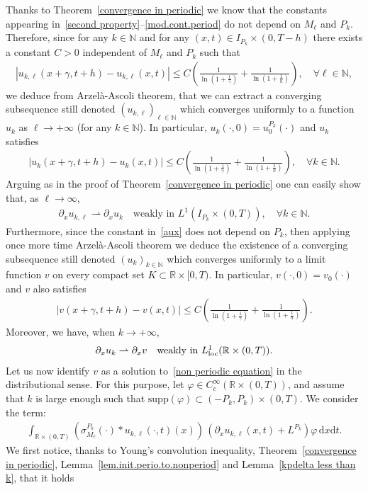 \documentclass[11pt]{amsart}
\newcommand{\dd}{\mathrm{d}}
\newcommand{\pa}{\partial}
\newcommand{\R}{\mathbb{R}}
\newcommand{\N}{\mathbb{N}}
\begin{document}
\begin{appendix}
Thanks to Theorem~\ref{convergence in periodic}  we know that the constants appearing in~\eqref{second property}--\eqref{mod.cont.period} do not depend on $M_\ell$ and $P_k$. Therefore, since for any $k\in\N$ and for any $(x,t)\in I_{P_k} \times (0,T-h)$ there exists a constant $C>0$ independent of $M_\ell$ and $P_k$ such that
\begin{align*}
    \left|u_{k,\ell}(x+\gamma,t+h)-u_{k,\ell}(x,t)\right| \leq C \left(\frac{1}{\ln(1+\frac{1}{\gamma})} + \frac{1}{\ln(1+\frac{1}{h})}\right), \quad \forall \ell \in \N,
\end{align*}
we deduce from Arzel\`a-Ascoli theorem, that we can extract a converging subsequence still denoted $(u_{k,\ell})_{\ell\in \N}$ which converges uniformly to a function $u_k$ as $\ell \to+ \infty$ (for any $k\in\N$). In particular, $u_k(\cdot,0)=u^{P_k}_0(\cdot)$ and $u_k$ satisfies
\begin{align}\label{aux}
    \left|u_k(x+\gamma,t+h)-u_k(x,t)\right| \leq C \left(\frac{1}{\ln(1+\frac{1}{\gamma})} + \frac{1}{\ln(1+\frac{1}{h})}\right), \quad \forall k \in \N.
\end{align}
Arguing as in the proof of Theorem~\ref{convergence in periodic} one can easily show that, as $\ell \to \infty$,
\begin{align}\label{weakstar.l.to.infty}
    \pa_x u_{k,\ell} \rightharpoonup \pa_x u_k \quad \mbox{weakly} \mbox{ in } L^1(I_{P_k}\times(0,T)), \quad \forall k\in\N.
\end{align}
Furthermore, since the constant in~\eqref{aux} does not depend on $P_k$, then applying once more time Arzel\`a-Ascoli theorem we deduce the existence of a converging subsequence still denoted $(u_k)_{k\in \N}$ which converges uniformly to a limit function $v$ on every compact set $K \subset \R \times [0,T)$. In particular, $v(\cdot,0)=v_0(\cdot)$ and $v$ also satisfies
\begin{align*}
    \left|v(x+\gamma,t+h)-v(x,t)\right| \leq C \left(\frac{1}{\ln(1+\frac{1}{\gamma})} + \frac{1}{\ln(1+\frac{1}{h})}\right). 
\end{align*}
Moreover, we have, when $k \to +\infty$,
\begin{align}\label{weakstar.k.to.infty}
    \pa_x u_k \rightharpoonup \pa_x v \quad \mbox{weakly}\mbox{ in } L^1_{\rm loc}(\R \times(0,T)).
\end{align}
Let us now identify $v$ as a solution to~\eqref{non periodic equation} in the distributional sense. For this purpose, let $\varphi \in C^\infty_c(\R \times (0,T))$, and assume that $k$ is large enough such that $\mathrm{supp}(\varphi) \subset (-P_k,P_k)\times(0,T)$. We consider the term:
\begin{align*}
    \int_{\R \times(0,T)} (\sigma_{M_\ell}^{P_k}(\cdot)\ast u_{k,\ell}(\cdot,t)(x)) \, \left(\pa_x u_{k,\ell}(x,t) + L^{P_k}\right) \varphi \, \dd x \dd t.
\end{align*}
We first notice, thanks to Young's convolution inequality, Theorem~\ref{convergence in periodic}, Lemma~\ref{lem.init.perio.to.nonperiod} and Lemma~\ref{kpdelta less than k}, that it holds


\end{appendix}
\end{document}
